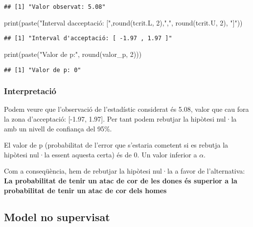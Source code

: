 \documentclass[
]{article}
\newenvironment{Shaded}{\begin{snugshade}}{\end{snugshade}}
\newcommand{\DecValTok}[1]{\textcolor[rgb]{0.86,0.86,0.80}{#1}}
\newcommand{\FunctionTok}[1]{\textcolor[rgb]{0.94,0.94,0.56}{#1}}
\newcommand{\NormalTok}[1]{\textcolor[rgb]{0.80,0.80,0.80}{#1}}
\newcommand{\StringTok}[1]{\textcolor[rgb]{0.80,0.58,0.58}{#1}}
\begin{document}
\begin{verbatim}
## [1] "Valor observat: 5.08"
\end{verbatim}

\begin{Shaded}
\begin{Highlighting}[]
\FunctionTok{print}\NormalTok{(}\FunctionTok{paste}\NormalTok{(}\StringTok{"Interval d\textquotesingle{}acceptació: ["}\NormalTok{,}\FunctionTok{round}\NormalTok{(tcrit.L, }\DecValTok{2}\NormalTok{),}\StringTok{","}\NormalTok{, }\FunctionTok{round}\NormalTok{(tcrit.U, }\DecValTok{2}\NormalTok{), }\StringTok{"]"}\NormalTok{))}
\end{Highlighting}
\end{Shaded}

\begin{verbatim}
## [1] "Interval d'acceptació: [ -1.97 , 1.97 ]"
\end{verbatim}

\begin{Shaded}
\begin{Highlighting}[]
\FunctionTok{print}\NormalTok{(}\FunctionTok{paste}\NormalTok{(}\StringTok{"Valor de p:"}\NormalTok{, }\FunctionTok{round}\NormalTok{(valor\_p, }\DecValTok{2}\NormalTok{)))}
\end{Highlighting}
\end{Shaded}

\begin{verbatim}
## [1] "Valor de p: 0"
\end{verbatim}

\hypertarget{interpretaciuxf3}{%
\subsubsection{Interpretació}\label{interpretaciuxf3}}

Podem veure que l'observació de l'estadístic considerat és 5.08, valor
que cau fora la zona d'acceptació: {[}-1.97, 1.97{]}. Per tant podem
rebutjar la hipòtesi nul·la amb un nivell de confiança del 95\%.

El valor de p (probabilitat de l'error que s'estaria cometent si es
rebutja la hipòtesi nul·la essent aquesta certa) és de 0. Un valor
inferior a \(\alpha\).

Com a conseqüència, hem de rebutjar la hipòtesi nul·la a favor de
l'alternativa: \textbf{La probabilitat de tenir un atac de cor de les
dones és superior a la probabilitat de tenir un atac de cor dels homes}

\hypertarget{model-no-supervisat}{%
\subsection{Model no supervisat}\label{model-no-supervisat}}
\end{document}
